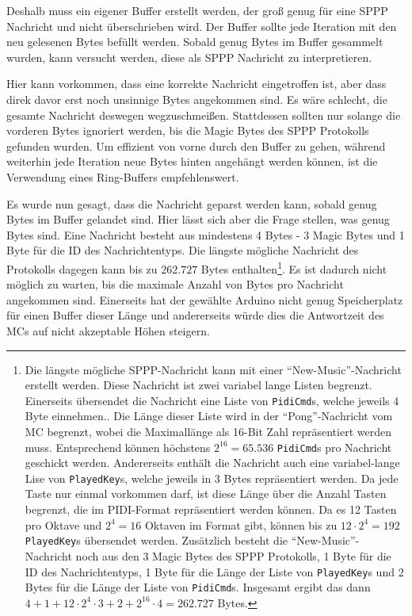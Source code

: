 Deshalb muss ein eigener Buffer erstellt werden, der groß genug für eine \ac{SPPP} Nachricht und nicht überschrieben wird.
Der Buffer sollte jede Iteration mit den neu gelesenen Bytes befüllt werden.
Sobald genug Bytes im Buffer gesammelt wurden, kann versucht werden, diese als \ac{SPPP} Nachricht zu interpretieren.

Hier kann vorkommen, dass eine korrekte Nachricht eingetroffen ist, aber dass direk davor erst noch unsinnige Bytes angekommen sind.
Es wäre schlecht, die gesamte Nachricht deswegen wegzuschmeißen.
Stattdessen sollten nur solange die vorderen Bytes ignoriert werden, bis die Magic Bytes des \ac{SPPP} Protokolls gefunden wurden.
Um effizient von vorne durch den Buffer zu gehen, während weiterhin jede Iteration neue Bytes hinten angehängt werden können, ist die Verwendung eines Ring-Buffers empfehlenswert.

Es wurde nun gesagt, dass die Nachricht geparst werden kann, sobald genug Bytes im Buffer gelandet sind.
Hier lässt sich aber die Frage stellen, was genug Bytes sind.
Eine Nachricht besteht aus mindestens 4 Bytes - 3 Magic Bytes und 1 Byte für die ID des Nachrichtentyps.
Die längste mögliche Nachricht des Protokolls dagegen kann bis zu $262.727$ Bytes enthalten\footnote{Die längste mögliche \ac{SPPP}-Nachricht kann mit einer \enquote{New-Music}-Nachricht erstellt werden. Diese Nachricht ist zwei variabel lange Listen begrenzt. Einerseits übersendet die Nachricht eine Liste von \lstinline|PidiCmd|s, welche jeweils 4 Byte einnehmen.. Die Länge dieser Liste wird in der \enquote{Pong}-Nachricht vom \ac{MC} begrenzt, wobei die Maximallänge als 16-Bit Zahl repräsentiert werden muss. Entsprechend können höchstens $2^{16} = 65.536$ \lstinline|PidiCmd|s pro Nachricht geschickt werden. Andererseits enthält die Nachricht auch eine variabel-lange Lise von \lstinline|PlayedKey|s, welche jeweils in 3 Bytes repräsentiert werden. Da jede Taste nur einmal vorkommen darf, ist diese Länge über die Anzahl Tasten begrenzt, die im \ac{PIDI}-Format repräsentiert werden können. Da es 12 Tasten pro Oktave und $2^4=16$ Oktaven im Format gibt, können bis zu $12 \cdot 2^4 = 192$ \lstinline|PlayedKey|s übersendet werden. Zusätzlich besteht die \enquote{New-Music}-Nachricht noch aus den 3 Magic Bytes des \ac{SPPP} Protokolls, 1 Byte für die ID des Nachrichtentyps, 1 Byte für die Länge der Liste von \lstinline|PlayedKey|s und 2 Bytes für die Länge der Liste von \lstinline|PidiCmd|s. Insgesamt ergibt das dann $4 + 1 + 12 \cdot 2^4 \cdot 3 + 2 + 2^{16} \cdot 4 = 262.727$ Bytes.}.
Es ist dadurch nicht möglich zu warten, bis die maximale Anzahl von Bytes pro Nachricht angekommen sind.
Einerseits hat der gewählte Arduino nicht genug Speicherplatz für einen Buffer dieser Länge und andererseits würde dies die Antwortzeit des \ac{MC}s auf nicht akzeptable Höhen steigern.

